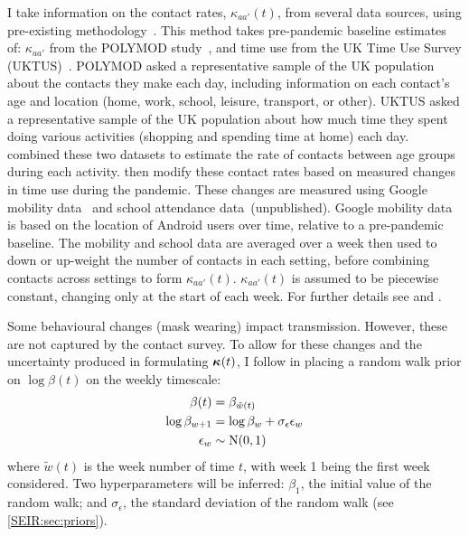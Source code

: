 \documentclass[thesis.tex]{subfiles}
\begin{document}
I take information on the contact rates, $\kappa_{aa'}(t)$, from several data sources, using pre-existing methodology~\autocites{vanleeuwenTime}{vanleeuwenAugmenting}.
This method takes pre-pandemic baseline estimates of: $\kappa_{aa'}$ from the POLYMOD study~\autocite{mossongSocial}, and time use from the UK Time Use Survey (UKTUS)~\autocite{UKTUS}.
POLYMOD asked a representative sample of the UK population about the contacts they make each day, including information on each contact's age and location (home, work, school, leisure, transport, or other).
UKTUS asked a representative sample of the UK population about how much time they spent doing various activities (\eg shopping and spending time at home) each day.
\Textcite{vanleeuwenAugmenting} combined these two datasets to estimate the rate of contacts between age groups during each activity.
\Textcite{birrellRealtime} then modify these contact rates based on measured changes in time use during the pandemic.
These changes are measured using Google mobility data~\autocite{googleCOVID19} and school attendance data~(unpublished).
Google mobility data is based on the location of Android users over time, relative to a pre-pandemic baseline.
The mobility and school data are averaged over a week then used to down or up-weight the number of contacts in each setting, before combining contacts across settings to form $\kappa_{aa'}(t)$.
$\kappa_{aa'}(t)$ is assumed to be piecewise constant, changing only at the start of each week.
For further details see \textcite{vanleeuwenAugmenting} and \textcite[supplementary material]{birrellRealtime}.

Some behavioural changes (\eg mask wearing) impact transmission.
However, these are not captured by the contact survey.
To allow for these changes and the uncertainty produced in formulating $\bm{\kappa}(t)$, I follow \textcite{birrellRealtime} in placing a random walk prior on $\log\beta(t)$  on the weekly timescale:
\begin{align}
    \beta(t) &= \beta_{\tilde{w}(t)} \\
    \log\beta_{w+1} &= \log\beta_w + \sigma_\epsilon \epsilon_w \\
    \epsilon_w &\sim \operatorname{N}(0, 1)
\end{align}
where $\tilde{w}(t)$ is the week number of time $t$, with week 1 being the first week considered.
Two hyperparameters will be inferred: $\beta_1$, the initial value of the random walk; and $\sigma_\epsilon$, the standard deviation of the random walk (see \cref{SEIR:sec:priors}).
\end{document}
